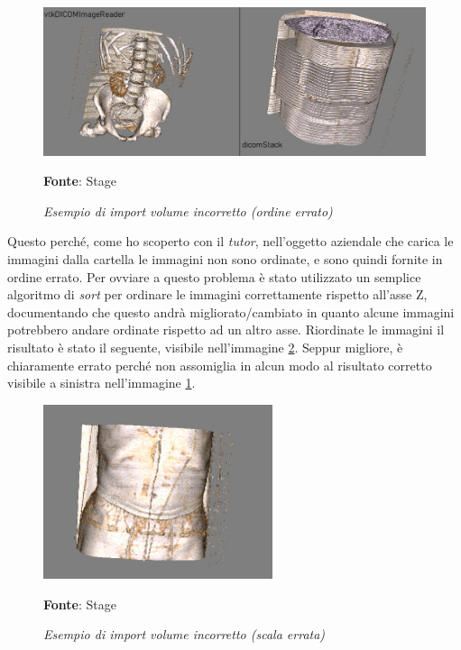 \begin{figure}[h]
    \centering
    \includegraphics[width=1\textwidth]{immagini/svolgimento/volumebrokenorder.jpg}
    \caption{\textit{Esempio di import volume incorretto (ordine errato)}}
    \textbf{Fonte}: Stage
    \label{fig: Volume Wrong Order}
\end{figure}

Questo perché, come ho scoperto con il \emph{tutor}, nell'oggetto aziendale che carica le immagini dalla cartella le immagini non sono ordinate, e sono quindi fornite in ordine errato. Per ovviare a questo problema è stato utilizzato un semplice algoritmo di \emph{sort} per ordinare le immagini correttamente rispetto all'asse Z, documentando che questo andrà migliorato/cambiato in quanto alcune immagini potrebbero andare ordinate rispetto ad un altro asse. Riordinate le immagini il risultato è stato il seguente, visibile nell'immagine \ref{fig: Volume Wrong Scale}. Seppur migliore, è chiaramente errato perché non assomiglia in alcun modo al risultato corretto visibile a sinistra nell'immagine \ref{fig: Volume Wrong Order}.

\begin{figure}[h]
    \centering
    \includegraphics[width=0.6\textwidth]{immagini/svolgimento/volumebrokenscale.jpeg}
    \caption{\textit{Esempio di import volume incorretto (scala errata)}}
    \textbf{Fonte}: Stage
    \label{fig: Volume Wrong Scale}
\end{figure}

